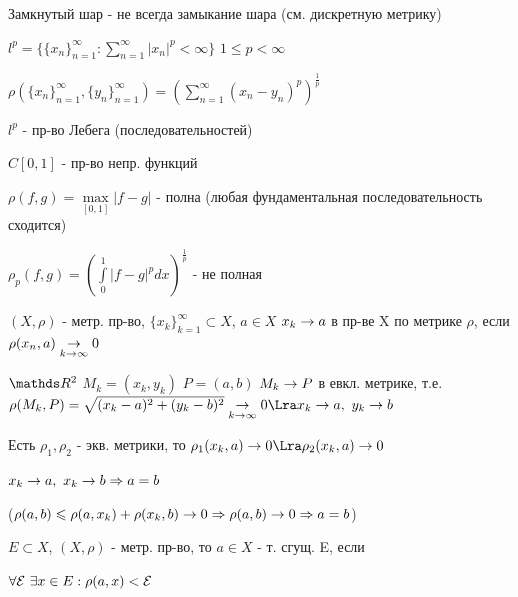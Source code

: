 \documentclass[main]{subfiles}
\begin{document}
    \begin{upr}
        Замкнутый шар - не всегда замыкание шара (см. дискретную метрику)
    \end{upr}

    \begin{example}
        $l^p=\{ \{x_n\}_{n=1}^\infty: \sum\limits_{n=1}^\infty |x_n|^p < \infty \}$ $1 \leqslant p < \infty$

        $\rho(\{x_n\}_{n=1}^\infty, \{y_n\}_{n=1}^\infty) = (\sum\limits_{n=1}^\infty (x_n-y_n)^p)^{\frac{1}{p}}$

        $l^p$ - пр-во Лебега (последовательностей)
    \end{example}

    \begin{example}
        $C[0,1]$ - пр-во непр. функций

        $\rho(f,g)=\max\limits_{[0,1]} |f-g|$ - полна (любая фундаментальная последовательность сходится)

        $\rho_p(f,g)=(\int\limits_0^1 |f-g|^p dx)^{\frac{1}{p}}$ - не полная
    \end{example}

    \begin{definition}
        $(X, \rho)$ - метр. пр-во, $\{x_k\}_{k=1}^\infty \subset X$, $a \in X$ $x_k \rightarrow a$ в пр-ве X по метрике $\rho$, если $\rho(x_n,a) \underset{k \rightarrow \infty}{\rightarrow} 0$
    \end{definition}

    \begin{examples}
        $\R^2$ $M_k=(x_k, y_k)$ $P=(a,b)$ $M_k \rightarrow P$ в евкл. метрике, т.е. $\rho(M_k,P)=\sqrt{(x_k-a)^2+(y_k-b)^2} \us{k \ra \infty}{\ra} 0 \Lra x_k \ra a,\ y_k \ra b$
    \end{examples}

    \begin{remark}
        Есть $\rho_1,\rho_2$ - экв. метрики, то $\rho_1(x_k,a) \ra 0 \Lra \rho_2(x_k,a) \ra 0$
    \end{remark}

    \begin{upr}
        $x_k \rightarrow a,\ x_k \rightarrow b \Rightarrow a=b$

        ($\rho(a,b) \leqslant \rho(a, x_k) + \rho(x_k,b) \rightarrow 0 \Rightarrow \rho (a,b) \rightarrow 0 \Rightarrow a=b$)
    \end{upr}

    \begin{definition}
        $E \subset X$, $(X, \rho)$ - метр. пр-во, то $a \in X$ - т. сгущ. E, если

        $\forall \mathcal{E} \ \exists x \in E: \rho(a,x) < \mathcal{E}$
    \end{definition}
\end{document}
